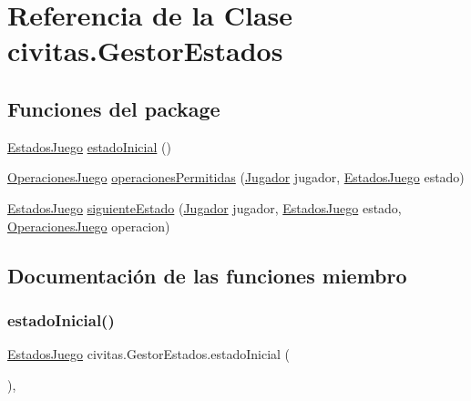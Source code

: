 \hypertarget{classcivitas_1_1GestorEstados}{}\section{Referencia de la Clase civitas.\+Gestor\+Estados}
\label{classcivitas_1_1GestorEstados}
\subsection*{Funciones del \textquotesingle{}package\textquotesingle{}}
\begin{DoxyCompactItemize}
\item 
\hyperlink{enumcivitas_1_1EstadosJuego}{Estados\+Juego} \hyperlink{classcivitas_1_1GestorEstados_a3a7954829b7f93dc943d7a5b94394fa4}{estado\+Inicial} ()
\item 
\hyperlink{enumcivitas_1_1OperacionesJuego}{Operaciones\+Juego} \hyperlink{classcivitas_1_1GestorEstados_afedd35720a2151fc774302109811685b}{operaciones\+Permitidas} (\hyperlink{classcivitas_1_1Jugador}{Jugador} jugador, \hyperlink{enumcivitas_1_1EstadosJuego}{Estados\+Juego} estado)
\item 
\hyperlink{enumcivitas_1_1EstadosJuego}{Estados\+Juego} \hyperlink{classcivitas_1_1GestorEstados_ab7195ef0d67677a23f48182f185a85c5}{siguiente\+Estado} (\hyperlink{classcivitas_1_1Jugador}{Jugador} jugador, \hyperlink{enumcivitas_1_1EstadosJuego}{Estados\+Juego} estado, \hyperlink{enumcivitas_1_1OperacionesJuego}{Operaciones\+Juego} operacion)
\end{DoxyCompactItemize}


\subsection{Documentación de las funciones miembro}
\mbox{\label{classcivitas_1_1GestorEstados_a3a7954829b7f93dc943d7a5b94394fa4}} 
\subsubsection{\texorpdfstring{estado\+Inicial()}{estadoInicial()}}
{\footnotesize\ttfamily \hyperlink{enumcivitas_1_1EstadosJuego}{Estados\+Juego} civitas.\+Gestor\+Estados.\+estado\+Inicial (\begin{DoxyParamCaption}{ }\end{DoxyParamCaption})\hspace{0.3cm}{\ttfamily [inline]}, {\ttfamily [package]}}

